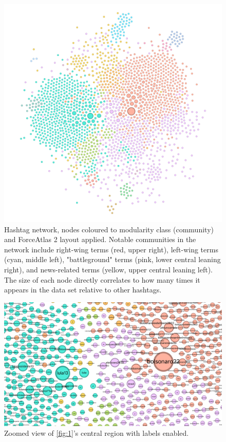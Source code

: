 \documentclass[a4paper,11pt]{article}  %
\begin{document}
	\begin{figure}
		\centering
		\includegraphics[height=0.5\textheight]{images/net_mod_app}
		\caption{Hashtag network, nodes coloured to modularity class (community) and ForceAtlas 2 layout applied. Notable communities in the network include right-wing terms (red, upper right), left-wing terms (cyan, middle left), "battleground" terms (pink, lower central leaning right), and news-related terms (yellow, upper central leaning left). The size of each node directly correlates to how many times it appears in the data set relative to other hashtags.\hfill}
		\label{fig:1}
	\end{figure}

	\begin{figure}
		\centering
		\includegraphics[height=0.3\textheight]{images/net_mod_app_detail}
		\caption{Zoomed view of \autoref{fig:1}'s central region with labels enabled.}
		\label{fig:2}
	\end{figure}
	
\end{document}
